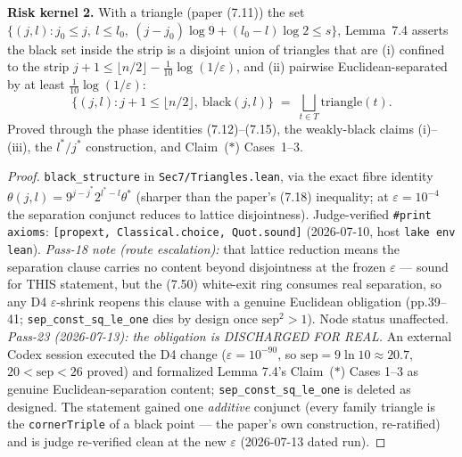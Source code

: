 \begin{lemma}[Black set = separated triangles; Lemma 7.4]\label{X3}
  \leanok
\textbf{Risk kernel 2.}  With a triangle (paper (7.11)) the set
\(\{(j,l) : j_0\le j,\ l\le l_0,\ (j-j_0)\log 9 + (l_0-l)\log 2 \le s\}\), Lemma~7.4 asserts
the black set inside the strip is a disjoint union of triangles that are (i) confined to the
strip \(j+1\le \lfloor n/2\rfloor - \tfrac{1}{10}\log(1/\varepsilon)\), and (ii) pairwise
Euclidean-separated by at least \(\tfrac{1}{10}\log(1/\varepsilon)\):
\[
  \{(j,l) : j{+}1\le \lfloor n/2\rfloor,\ \text{black}(j,l)\}
    \;=\; \bigsqcup_{t\in T} \mathrm{triangle}(t).
\]
Proved through the phase identities (7.12)--(7.15), the weakly-black claims (i)--(iii), the
\(l^*/j^*\) construction, and Claim~(\(*\)) Cases~1--3.
\end{lemma}
\begin{proof}
  \leanok
  \texttt{black\_structure} in \texttt{Sec7/Triangles.lean}, via the exact fibre identity
  \(\theta(j,l) = 9^{j-j^*}2^{l^*-l}\theta^*\) (sharper than the paper's (7.18) inequality;
  at \(\varepsilon = 10^{-4}\) the separation conjunct reduces to lattice disjointness).
  Judge-verified \texttt{\#print axioms}: \texttt{[propext, Classical.choice, Quot.sound]}
  (2026-07-10, host \texttt{lake env lean}).
  \emph{Pass-18 note (route escalation):} that lattice reduction means the separation
  clause carries no content beyond disjointness at the frozen \(\varepsilon\) --- sound
  for THIS statement, but the (7.50) white-exit ring consumes real separation, so any
  D4 \(\varepsilon\)-shrink reopens this clause with a genuine Euclidean obligation
  (pp.39--41; \texttt{sep\_const\_sq\_le\_one} dies by design once
  \(\mathrm{sep}^2 > 1\)).  Node status unaffected.
  \emph{Pass-23 (2026-07-13): the obligation is DISCHARGED FOR REAL.}  An external
  Codex session executed the D4 change (\(\varepsilon = 10^{-90}\), so
  \(\mathrm{sep} = 9\ln 10 \approx 20.7\), \(20 < \mathrm{sep} < 26\) proved) and
  formalized Lemma 7.4's Claim~(\(*\)) Cases 1--3 as genuine Euclidean-separation
  content; \texttt{sep\_const\_sq\_le\_one} is deleted as designed.  The statement
  gained one \emph{additive} conjunct (every family triangle is the
  \texttt{cornerTriple} of a black point --- the paper's own construction,
  re-ratified) and is judge re-verified clean at the new \(\varepsilon\)
  (2026-07-13 dated run).
\end{proof}

